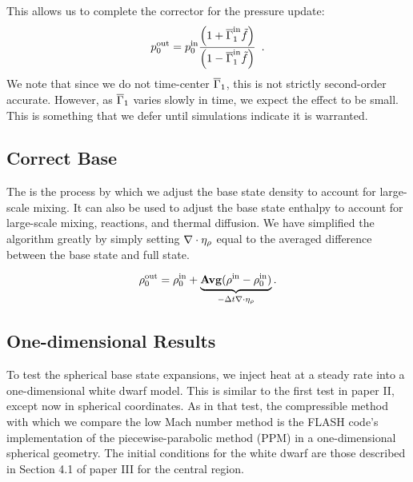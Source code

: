\begin{enumerate}
This allows us to complete the corrector for the pressure update:
\begin{equation}
p_0^{\mathrm{out}} = p_0^{\mathrm{in}} \frac{\left(1 + \overline{\Gamma}_1^{\mathrm{in}} \tilde{f}\right)}{\left(1 - \overline{\Gamma}_1^{\mathrm{in}} \tilde{f}\right)}\enskip .
\end{equation}
We note that since we do not time-center $\overline{\Gamma}_1$, this is not
strictly second-order accurate.  However, as $\overline{\Gamma}_1$ varies slowly
in time, we expect the effect to be small.  This is something that we 
defer until simulations indicate it is warranted. 

\end{enumerate}

\subsection{\bf{Correct Base}}

The is the process by which we adjust the base state density to account for
large-scale mixing.  It can also be used to adjust the base state enthalpy
to account for large-scale mixing, reactions, and thermal diffusion.
We have simplified the algorithm greatly by simply setting $\nabla\cdot\eta_{\rho}$
equal to the averaged difference between the base state and full state.

\begin{equation}
\rho_0^{\mathrm{out}} = \rho_0^{\mathrm{in}} + \underbrace{{\rm{\bf Avg}}(\rho^{\mathrm{in}} - \rho_0^{\mathrm{in}})}_{-\Delta t\nabla\cdot\eta_{\rho}}.
\end{equation}

\subsection{One-dimensional Results}

To test the spherical base state expansions, we inject heat at a
steady rate into a one-dimensional white dwarf model.  This is similar
to the first test in paper II, except now in spherical coordinates.
As in that test, the compressible method with which we compare the low Mach number method 
is the FLASH code's implementation of the
piecewise-parabolic method (PPM) in a one-dimensional spherical geometry.  
The initial conditions for the white dwarf are those described in
Section 4.1 of paper III for the central region.


